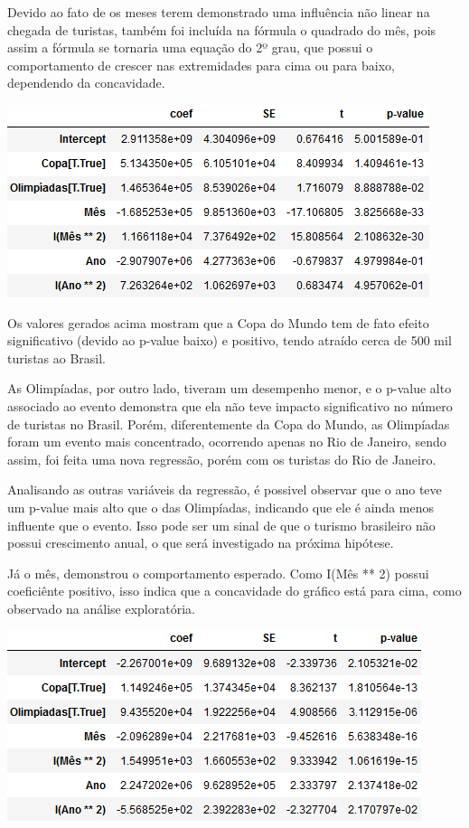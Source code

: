\documentclass[review]{elsarticle}
\begin{document}
Devido ao fato de os meses terem demonstrado uma influência não linear na chegada de turistas, também foi incluída na fórmula o quadrado do mês, pois assim a fórmula se tornaria uma equação do 2º grau, que possui o comportamento de crescer nas extremidades para cima ou para baixo, dependendo da concavidade.

\includegraphics[width=\textwidth]{Regression-BR}

Os valores gerados acima mostram que a Copa do Mundo tem de fato efeito significativo (devido ao p-value baixo) e positivo, tendo atraído cerca de 500 mil turistas ao Brasil.

As Olimpíadas, por outro lado, tiveram um desempenho menor, e o p-value alto associado ao evento demonstra que ela não teve impacto significativo no número de turistas no Brasil. Porém, diferentemente da Copa do Mundo, as Olimpíadas foram um evento mais concentrado, ocorrendo apenas no Rio de Janeiro, sendo assim, foi feita uma nova regressão, porém com os turistas do Rio de Janeiro.

Analisando as outras variáveis da regressão, é possivel observar que o ano teve um p-value mais alto que o das Olimpíadas, indicando que ele é ainda menos influente que o evento. Isso pode ser um sinal de que o turismo brasileiro não possui crescimento anual, o que será investigado na próxima hipótese.

Já o mês, demonstrou o comportamento esperado. Como I(Mês ** 2) possui coeficiênte positivo, isso indica que a concavidade do gráfico está para cima, como observado na análise exploratória.

\includegraphics[width=\textwidth]{Regression-RJ}
\end{document}
